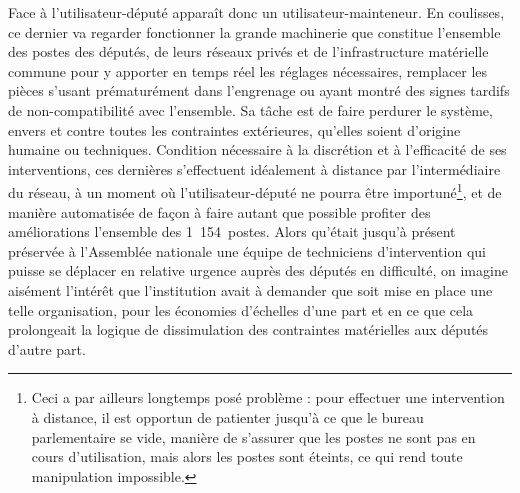 \documentclass{FramateX}
\begin{document}
\begin{refsection}
Face à l'utilisateur-député apparaît donc un
utilisateur-mainteneur. En coulisses, ce dernier va regarder
fonctionner la grande machinerie que constitue l'ensemble des postes
des députés, de leurs réseaux privés et de l'infrastructure matérielle
commune pour y apporter en temps réel les réglages nécessaires,
remplacer les pièces s'usant prématurément dans l'engrenage ou ayant
montré des signes tardifs de non-compatibilité avec l'ensemble. Sa
tâche est de faire perdurer le système, envers et contre toutes les
contraintes extérieures, qu'elles soient d'origine humaine ou
techniques. Condition nécessaire à la discrétion et à l'efficacité de
ses interventions, ces dernières s'effectuent idéalement à distance par
l'intermédiaire du réseau, à un moment où l'utilisateur-député ne
pourra être importuné\footnote{Ceci a par ailleurs longtemps posé
problème : pour effectuer une intervention à distance, il est opportun
de patienter jusqu'à ce que le bureau parlementaire se vide, manière de
s'assurer que les postes ne sont pas en cours d'utilisation, mais alors
les postes sont éteints, ce qui rend toute manipulation impossible.
}, et de manière automatisée de façon à faire autant que
possible profiter des améliorations l'ensemble des 1~154~postes. Alors
qu'était jusqu'à présent préservée à l'Assemblée nationale une équipe
de techniciens d'intervention qui puisse se déplacer en relative
urgence auprès des députés en difficulté, on imagine aisément l'intérêt
que l'institution avait à demander que soit mise en place une telle
organisation, pour les économies d'échelles d'une part et en ce que
cela prolongeait la logique de dissimulation des contraintes
matérielles aux députés d'autre part.



\end{refsection}
\end{document}
